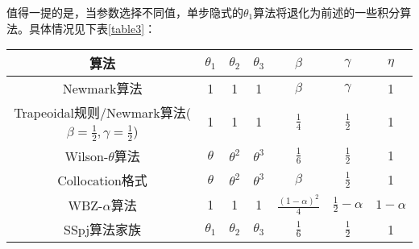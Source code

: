 值得一提的是，当参数选择不同值，单步隐式的$\theta_1$算法将退化为前述的一些积分算法。具体情况见下表\ref{table3}：
\begin{table}[htbp]
\vspace{0.5em}\centering\wuhao
\begin{tabular}{ccccccc}
\toprule[1.5pt]
算法 & $\theta_1$ & $\theta_2$ & $\theta_3$ & $\beta$ & $\gamma$ & $\eta$\\
\midrule[1pt]
Newmark算法 & 1 & 1 & 1 & $\beta$ & $\gamma$ & 1\\ [0.5em]
Trapeoidal规则/Newmark算法($\beta=\frac{1}{2},\gamma=\frac12$) & 1 & 1 & 1 & $\frac{1}{4}$ & $\frac12$ & 1\\ [0.5em]
Wilson-$\theta$算法 & $\theta$ & $\theta^2$ & $\theta^3$ & $\frac16$ & $\frac{1}{2}$ & 1 \\ [0.5em]
Collocation格式\cite{Hilber1978} & $\theta$ & $\theta^2$ & $\theta^3$ & $\beta$ & $\frac{1}{2}$ & 1 \\ [0.5em]
WBZ-$\alpha$算法 & 1 & 1 & 1 & $\frac{(1-\alpha)^2}{4}$ & $\frac{1}{2}-\alpha$ & $1-\alpha$ \\ [0.5em]
SSpj算法家族\cite{Zienkiewicz1984a,Wood1984} & $\theta_1$ & $\theta_2$ & $\theta_3$ & $\frac16$ & $\frac{1}{2}$ & 1 \\
\bottomrule[1.5pt]
\end{tabular}
\end{table}

